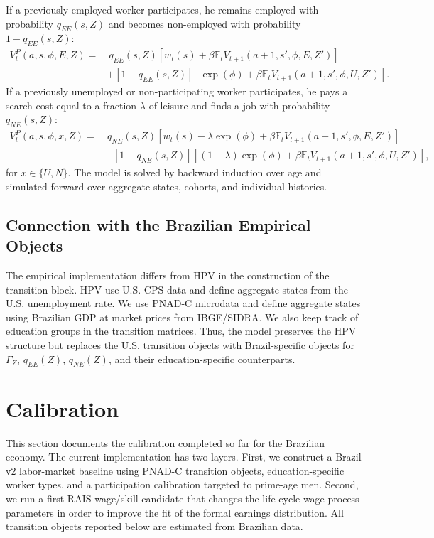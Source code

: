 \documentclass[12pt]{article}
\begin{document}
	If a previously employed worker participates, he remains employed with probability $q_{EE}(s,Z)$ and becomes non-employed with probability $1-q_{EE}(s,Z)$:
	\begin{align}
		V_t^P(a,s,\phi,E,Z)=&\ q_{EE}(s,Z)\left[w_t(s)+\beta\mathbb{E}_tV_{t+1}(a+1,s',\phi,E,Z')\right] \\
		&+[1-q_{EE}(s,Z)]\left[\exp(\phi)+\beta\mathbb{E}_tV_{t+1}(a+1,s',\phi,U,Z')\right].
	\end{align}
	If a previously unemployed or non-participating worker participates, he pays a search cost equal to a fraction $\lambda$ of leisure and finds a job with probability $q_{NE}(s,Z)$:
	\begin{align}
		V_t^P(a,s,\phi,x,Z)=&\ q_{NE}(s,Z)\left[w_t(s)-\lambda\exp(\phi)+\beta\mathbb{E}_tV_{t+1}(a+1,s',\phi,E,Z')\right] \\
		&+[1-q_{NE}(s,Z)]\left[(1-\lambda)\exp(\phi)+\beta\mathbb{E}_tV_{t+1}(a+1,s',\phi,U,Z')\right],
	\end{align}
	for $x\in\{U,N\}$. The model is solved by backward induction over age and simulated forward over aggregate states, cohorts, and individual histories.
	
	\subsection{Connection with the Brazilian Empirical Objects}
	
	The empirical implementation differs from HPV in the construction of the transition block. HPV use U.S. CPS data and define aggregate states from the U.S. unemployment rate. We use PNAD-C microdata and define aggregate states using Brazilian GDP at market prices from IBGE/SIDRA. We also keep track of education groups in the transition matrices. Thus, the model preserves the HPV structure but replaces the U.S. transition objects with Brazil-specific objects for $\Gamma_Z$, $q_{EE}(Z)$, $q_{NE}(Z)$, and their education-specific counterparts.
	
	\section{Calibration} \label{sec:calibration}
	
	This section documents the calibration completed so far for the Brazilian economy. The current implementation has two layers. First, we construct a Brazil v2 labor-market baseline using PNAD-C transition objects, education-specific worker types, and a participation calibration targeted to prime-age men. Second, we run a first RAIS wage/skill candidate that changes the life-cycle wage-process parameters in order to improve the fit of the formal earnings distribution. All transition objects reported below are estimated from Brazilian data.
	
\end{document}
